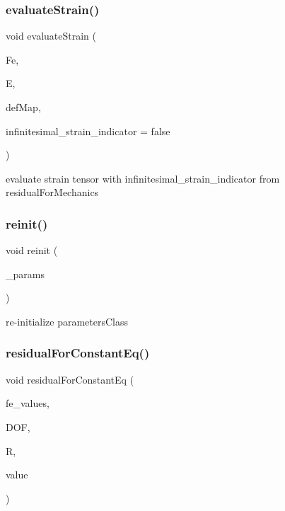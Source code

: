 \subsubsection{\texorpdfstring{evaluateStrain()}{evaluateStrain()}}
{\footnotesize\ttfamily void evaluate\+Strain (\begin{DoxyParamCaption}\item[{dealii\+::\+Table$<$ 3, T $>$ \&}]{Fe,  }\item[{dealii\+::\+Table$<$ 3, T $>$ \&}]{E,  }\item[{\mbox{\hyperlink{structdeformation_map}{deformation\+Map}}$<$ T, dim $>$ \&}]{def\+Map,  }\item[{bool}]{infinitesimal\+\_\+strain\+\_\+indicator = {\ttfamily false} }\end{DoxyParamCaption})}

evaluate strain tensor with infinitesimal\+\_\+strain\+\_\+indicator from residual\+For\+Mechanics \mbox{\label{class_residual_a683e96e9d88d46820c0964786424fdf2}} 
\subsubsection{\texorpdfstring{reinit()}{reinit()}}
{\footnotesize\ttfamily void reinit (\begin{DoxyParamCaption}\item[{dealii\+::\+Parameter\+Handler \&}]{\+\_\+params }\end{DoxyParamCaption})}

re-\/initialize parameters\+Class \mbox{\label{class_residual_ab1fcf2c2ae911f4d0c73e59e60f1e6ad}} 
\subsubsection{\texorpdfstring{residualForConstantEq()}{residualForConstantEq()}\hspace{0.1cm}{\footnotesize\ttfamily [1/2]}}
{\footnotesize\ttfamily void residual\+For\+Constant\+Eq (\begin{DoxyParamCaption}\item[{const F\+E\+Values$<$ dim $>$ \&}]{fe\+\_\+values,  }\item[{unsigned int}]{D\+OF,  }\item[{dealii\+::\+Table$<$ 1, T $>$ \&}]{R,  }\item[{dealii\+::\+Table$<$ 1, T $>$ \&}]{value }\end{DoxyParamCaption})}

